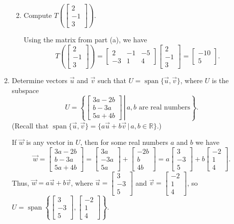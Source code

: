 \documentclass[12pt]{article}
\newcommand{\points}[1]{\marginpar{\hspace{24pt}[#1]}}
\newcommand{\R}{\mathbb{R}}
\newcommand{\bbm}{\begin{bmatrix}}
\newcommand{\ebm}{\end{bmatrix}}
\begin{document}
\begin{enumerate}
\begin{enumerate}
\medskip

 \item Compute $T\left(\bbm 2\\-1\\3\ebm\right)$. \points{3}

\bigskip

Using the matrix from part (a), we have
\[
 T\left(\bbm 2\\-1\\3\ebm\right) = \bbm 2&-1&-5\\-3&1&4\ebm\bbm 2\\-1\\3\ebm = \bbm -10\\5\ebm.
\]

\end{enumerate}

\newpage

\item Determine vectors $\vec{u}$ and $\vec{v}$ such that $U=\operatorname{span}\{\vec{u},\vec{v}\}$, where $U$ is the subspace \points{4}
\[
 U = \left\{\left.\bbm 3a-2b\\b-3a\\5a+4b\ebm \,\right|\, a,b \text{ are real numbers}\right\}.
\]
(Recall that $\operatorname{span}\{\vec{u},\vec{v}\} = \{a\vec{u}+b\vec{v}\,|\, a,b\in\R\}$.)

\bigskip

If $\vec{w}$ is any vector in $U$, then for some real numbers $a$ and $b$ we have
\[
 \vec{w} = \bbm 3a-2b\\b-3a\\5a+4b\ebm = \bbm 3a\\-3a\\5a\ebm + \bbm -2b\\b\\4b\ebm = a\bbm 3\\-3\\5\ebm + b\bbm -2\\1\\4\ebm.
\]
Thus, $\vec{w} = a\vec{u}+b\vec{v}$, where $\vec{u} =\bbm 3\\-3\\5\ebm$ and $\vec{v} = \bbm -2\\1\\4\ebm$, so $U=\operatorname{span}\left\{\bbm 3\\-3\\5\ebm,\bbm -2\\1\\4\ebm\right\}$.

\bigskip


\end{enumerate}
\end{document}
